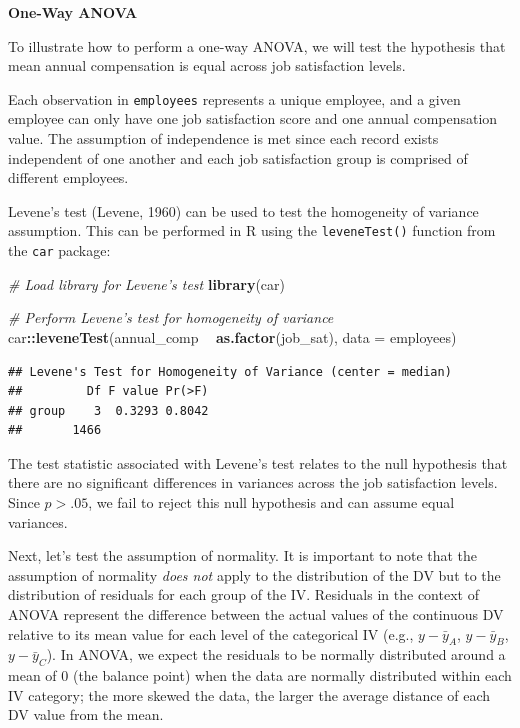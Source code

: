 \documentclass[]{book}
\newenvironment{Shaded}{\begin{snugshade}}{\end{snugshade}}
\newcommand{\CommentTok}[1]{\textcolor[rgb]{0.56,0.35,0.01}{\textit{#1}}}
\newcommand{\DataTypeTok}[1]{\textcolor[rgb]{0.13,0.29,0.53}{#1}}
\newcommand{\KeywordTok}[1]{\textcolor[rgb]{0.13,0.29,0.53}{\textbf{#1}}}
\newcommand{\NormalTok}[1]{#1}
\newcommand{\OperatorTok}[1]{\textcolor[rgb]{0.81,0.36,0.00}{\textbf{#1}}}
\newcommand{\StringTok}[1]{\textcolor[rgb]{0.31,0.60,0.02}{#1}}
\begin{document}
\textbf{One-Way ANOVA}

To illustrate how to perform a one-way ANOVA, we will test the hypothesis that mean annual compensation is equal across job satisfaction levels.

Each observation in \texttt{employees} represents a unique employee, and a given employee can only have one job satisfaction score and one annual compensation value. The assumption of independence is met since each record exists independent of one another and each job satisfaction group is comprised of different employees.

Levene's test (Levene, 1960) can be used to test the homogeneity of variance assumption. This can be performed in R using the \texttt{leveneTest()} function from the \texttt{car} package:

\begin{Shaded}
\begin{Highlighting}[]
\CommentTok{# Load library for Levene's test}
\KeywordTok{library}\NormalTok{(car)}

\CommentTok{# Perform Levene's test for homogeneity of variance}
\NormalTok{car}\OperatorTok{::}\KeywordTok{leveneTest}\NormalTok{(annual_comp }\OperatorTok{~}\StringTok{ }\KeywordTok{as.factor}\NormalTok{(job_sat), }\DataTypeTok{data =}\NormalTok{ employees)}
\end{Highlighting}
\end{Shaded}

\begin{verbatim}
## Levene's Test for Homogeneity of Variance (center = median)
##         Df F value Pr(>F)
## group    3  0.3293 0.8042
##       1466
\end{verbatim}

The test statistic associated with Levene's test relates to the null hypothesis that there are no significant differences in variances across the job satisfaction levels. Since \(p > .05\), we fail to reject this null hypothesis and can assume equal variances.

Next, let's test the assumption of normality. It is important to note that the assumption of normality \emph{does not} apply to the distribution of the DV but to the distribution of residuals for each group of the IV. Residuals in the context of ANOVA represent the difference between the actual values of the continuous DV relative to its mean value for each level of the categorical IV (e.g., \(y - \bar{y}_A\), \(y - \bar{y}_B\), \(y - \bar{y}_C\)). In ANOVA, we expect the residuals to be normally distributed around a mean of 0 (the balance point) when the data are normally distributed within each IV category; the more skewed the data, the larger the average distance of each DV value from the mean.
\end{document}
